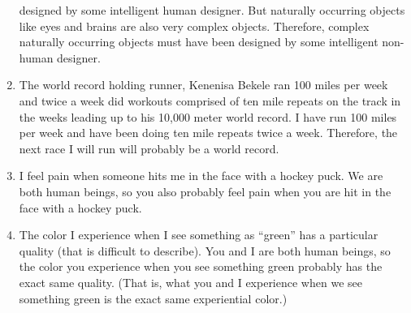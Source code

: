 \begin{enumerate}
designed by some intelligent human designer. But naturally occurring
objects like eyes and brains are also very complex objects. Therefore,
complex naturally occurring objects must have been designed by
some intelligent non-human designer.
\item The world record holding runner, Kenenisa Bekele ran 100 miles per
week and twice a week did workouts comprised of ten mile repeats on
the track in the weeks leading up to his 10,000 meter world record. I
have run 100 miles per week and have been doing ten mile repeats
twice a week. Therefore, the next race I will run will probably be a
world record.
\item I feel pain when someone hits me in the face with a hockey puck. We
are both human beings, so you also probably feel pain when you are
hit in the face with a hockey puck.
\item The color I experience when I see something as ``green'' has a
particular quality (that is difficult to describe). You and I are both
human beings, so the color you experience when you see something
green probably has the exact same quality. (That is, what you and I
experience when we see something green is the exact same
experiential color.)
\end{enumerate}
